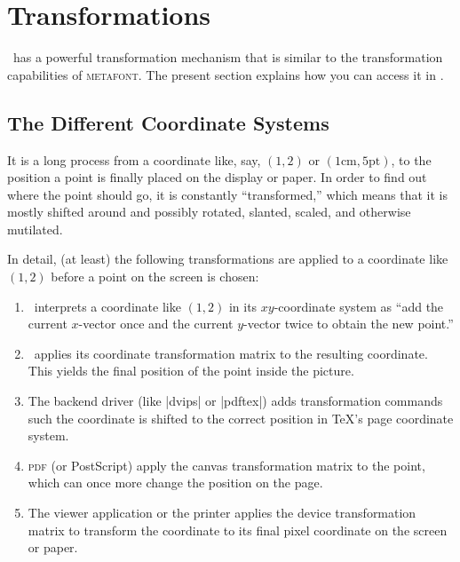%
%
%

\section{Transformations}

\pgfname\ has a powerful transformation mechanism that is similar to
the transformation capabilities of \textsc{metafont}. The present
section explains how you can access it in \tikzname.


\subsection{The Different Coordinate Systems}

It is a long process from  a coordinate like, say, $(1,2)$ or
$(1\mathrm{cm},5\mathrm{pt})$, to the position a point is finally
placed on the display or paper. In order to find out where the point
should go, it is constantly ``transformed,'' which means that it is
mostly shifted around and possibly rotated, slanted, scaled, and
otherwise mutilated. 

In detail, (at least) the following transformations are applied to a
coordinate like $(1,2)$ before a point on the screen is chosen:
\begin{enumerate}
\item
  \pgfname\ interprets a coordinate like $(1,2)$  in its
  $xy$-coordinate system as ``add the current $x$-vector once and the
  current $y$-vector twice to obtain the new point.''
\item
  \pgfname\ applies its coordinate transformation matrix to the
  resulting coordinate. This yields the final position of the point 
  inside the picture.
\item
  The backend driver (like |dvips| or |pdftex|) adds transformation
  commands such the coordinate is shifted to the correct position in
  \TeX's page coordinate system.
\item
  \textsc{pdf} (or PostScript) apply the canvas transformation
  matrix to the point, which can once more change the position on the
  page. 
\item
  The viewer application or the printer applies the device
  transformation matrix to transform the coordinate to its final pixel
  coordinate on the screen or paper.  
\end{enumerate}


